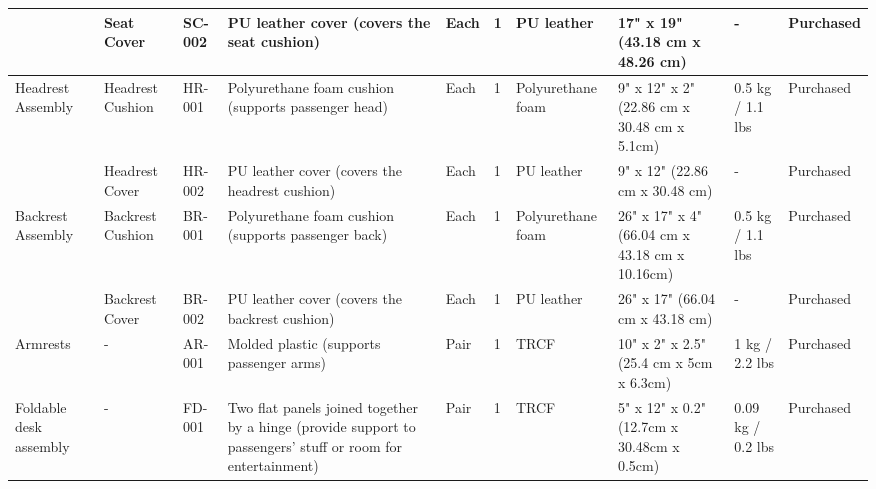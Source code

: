 \begin{sidewaystable}[thp]
{\begin{tabular}{llllllllll}
                                               & Seat Cover       & SC-002 & PU leather cover (covers the seat cushion)          & Each       & 1        & PU leather                      & 17" x 19" (43.18 cm x 48.26 cm)                & -                  & Purchased \\
    \midrule
    \multirow{2}{*}{Headrest Assembly}                          & Headrest Cushion & HR-001 & Polyurethane foam cushion (supports passenger head)       & Each       & 1        & Polyurethane foam                     & 9" x 12" x 2" (22.86 cm x 30.48 cm x 5.1cm)                                       & 0.5 kg / 1.1 lbs   & Purchased \\
                                               & Headrest Cover   & HR-002 & PU leather cover (covers the headrest cushion)      & Each       & 1        & PU leather                      &        9" x 12" (22.86 cm x 30.48 cm)                                         & -                   &  Purchased         \\
    \midrule
    \multirow{2}{*}{Backrest Assembly}                          & Backrest Cushion & BR-001 & Polyurethane foam cushion (supports passenger back)       & Each       & 1        & Polyurethane foam                     & 26" x 17" x 4" (66.04 cm x 43.18 cm x 10.16cm)                                       & 0.5 kg / 1.1 lbs   & Purchased \\
    & Backrest Cover   & BR-002 & PU leather cover (covers the backrest cushion)      & Each       & 1        & PU leather                      &              26" x 17" (66.04 cm x 43.18 cm)                                    & -                   &  Purchased         \\
    \midrule
                                               Armrests                                   & -                & AR-001 & Molded plastic (supports passenger arms)                  & Pair       & 1        & TRCF                        & 10" x 2" x 2.5" (25.4 cm x 5cm x 6.3cm)                                      & 1 kg / 2.2 lbs     & Purchased \\
    \midrule
    Foldable desk assembly & - & FD-001 & Two flat panels joined together by a hinge (provide support to passengers' stuff or room for entertainment) & Pair & 1 & TRCF & 5" x 12" x 0.2" (12.7cm x 30.48cm x 0.5cm) & 0.09 kg / 0.2 lbs & Purchased \\

\end{tabular}}
\end{sidewaystable}
